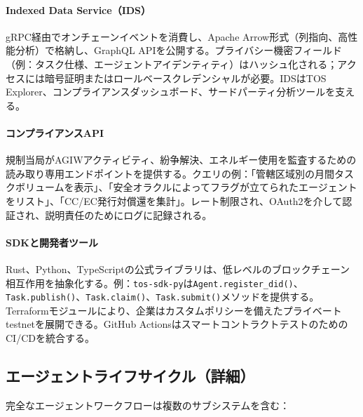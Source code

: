 \documentclass[11pt]{article}
\begin{document}
\paragraph{Indexed Data Service（IDS）} gRPC経由でオンチェーンイベントを消費し、Apache Arrow形式（列指向、高性能分析）で格納し、GraphQL APIを公開する。プライバシー機密フィールド（例：タスク仕様、エージェントアイデンティティ）はハッシュ化される；アクセスには暗号証明またはロールベースクレデンシャルが必要。IDSはTOS Explorer、コンプライアンスダッシュボード、サードパーティ分析ツールを支える。

\paragraph{コンプライアンスAPI} 規制当局がAGIWアクティビティ、紛争解決、エネルギー使用を監査するための読み取り専用エンドポイントを提供する。クエリの例：「管轄区域別の月間タスクボリュームを表示」、「安全オラクルによってフラグが立てられたエージェントをリスト」、「CC/EC発行対償還を集計」。レート制限され、OAuth2を介して認証され、説明責任のためにログに記録される。

\paragraph{SDKと開発者ツール} Rust、Python、TypeScriptの公式ライブラリは、低レベルのブロックチェーン相互作用を抽象化する。例：\texttt{tos-sdk-py}は\texttt{Agent.register\_did()}、\texttt{Task.publish()}、\texttt{Task.claim()}、\texttt{Task.submit()}メソッドを提供する。Terraformモジュールにより、企業はカスタムポリシーを備えたプライベートtestnetを展開できる。GitHub Actionsはスマートコントラクトテストのための CI/CDを統合する。

\subsection{エージェントライフサイクル（詳細）}
完全なエージェントワークフローは複数のサブシステムを含む：
\end{document}
